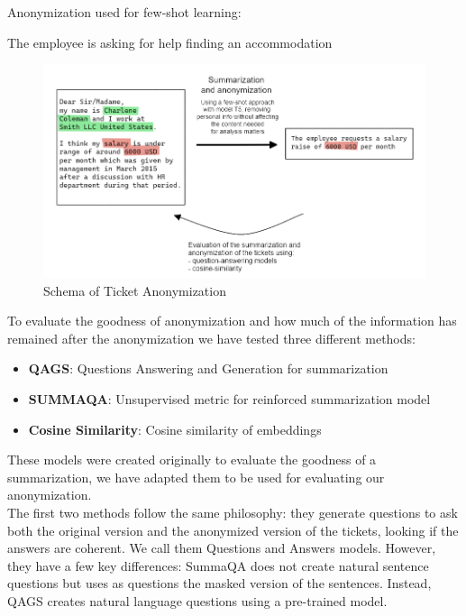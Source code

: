 Anonymization used for few-shot learning:
\begin{adjustwidth}{1cm}{}
    The employee is asking for help finding an accommodation
\end{adjustwidth}
\begin{figure}[h] 
    \includegraphics[width=\textwidth]{images/ticket_anonymization_schema.png}
    \caption{Schema of Ticket Anonymization}
    \label{fig:schema_ticket_anonymization}
\end{figure}    
To evaluate the goodness of anonymization and how much of the information has remained after the anonymization we have tested three different methods:
\begin{itemize}
    \item \textbf{QAGS}: Questions Answering and Generation for summarization
    \item \textbf{SUMMAQA}: Unsupervised metric for reinforced summarization model 
    \item \textbf{Cosine Similarity}: Cosine similarity of embeddings
\end{itemize}  
These models were created originally to evaluate the goodness of a summarization, we have adapted them to be used for evaluating our anonymization. \\
The first two methods follow the same philosophy: they generate questions to ask both the original version and the anonymized version of the tickets, looking if the answers are coherent. We call them Questions and Answers models.
However, they have a few key differences: SummaQA does not create natural sentence questions but uses as questions the masked version of the sentences. Instead, QAGS creates natural language questions using a pre-trained model.
